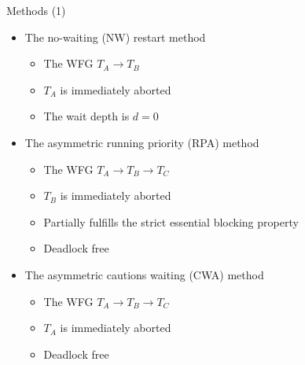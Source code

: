 \documentclass[sans]{beamer}
\begin{document}
\begin{frame}{Methods (1)}
  \begin{itemize}
    \item The no-waiting (NW) restart method
      \begin{itemize}
        \item The WFG $T_A \rightarrow T_B$
        \item $T_A$ is immediately aborted
        \item The wait depth is $d = 0$
      \end{itemize}
    \item The asymmetric running priority (RPA) method
      \begin{itemize}
        \item The WFG $T_A \rightarrow T_B \rightarrow T_C$
        \item $T_B$ is immediately aborted
        \item Partially fulfills the strict essential blocking property
        \item Deadlock free
      \end{itemize}
    \item The asymmetric cautions waiting (CWA) method
      \begin{itemize}
        \item The WFG $T_A \rightarrow T_B \rightarrow T_C$
        \item $T_A$ is immediately aborted
        \item Deadlock free
      \end{itemize}
  \end{itemize}
\end{frame}
\end{document}
